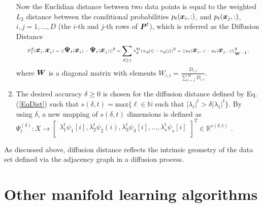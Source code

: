 \begin{enumerate}
{Now the Euclidian distance between two data points is equal to the weighted $L_2$ distance between the conditional probabilities ${{p}_t({\mbox{\boldmath $x$}}_i,:)}$, and ${{p}_t({\mbox{\boldmath $x$}}_j,:)}$, $i,j=1,...,D$ (the $i$-th and $j$-th rows of ${\mbox{\boldmath $P$}}^t$), which is referred as the Diffusion Distance
			\begin{equation}{ \label{EqDist} { {\cal{D}}^2_t( \myvec{x}_i,\myvec{x}_j)=||{\mymat{\Psi}_t{(\myvec{x}_i)}}-{\mymat{\Psi}_t{(\myvec{x}_j)}}||^2={  \sum_{d\geq{1}} {\lambda}^{2t}_d (\psi_d[i]-\psi_d[j])^2 }}=\\
			||{p_t}(\myvec{x}_i,:)-{p_t}(\myvec{x}_j,:)||^2_{\tiny\mymat{W}^{-1}}},
			\end{equation}
			where ${\mbox{\boldmath $W$}}$ is a diagonal matrix with elements
			$W_{i,i}=\frac{D_{i,i}}{\sum_{i=1}^M D_{i,i}}$.}
	\item{The desired accuracy $\delta \geq 0$ is chosen for the diffusion distance defined by Eq. (\ref{EqDist}) such that
		$s(\delta,t)=\text{max} \{\ell\in \mathbb{N}$  such that   $|\lambda_{\ell}|^t > \delta |\lambda_1|^t \}  $. By using $\delta$, a new mapping
		of $s(\delta,t)$ dimensions is defined as \\ \begin{math} {\Psi^{(\delta)}_t :  X \rightarrow \begin{bmatrix}
			{ \lambda_1^{t}\psi_1[i]} , { \lambda_2^{t}\psi_2(i)} , {
				\lambda_3^{t}\psi_3[i]} , {.} {.} {.}   ,
			
			{\lambda_{s}^{t}\psi_{s}[i]}\\
			
			\end{bmatrix}^T \in \mathbb{R}^{s(\delta,t)}} \end{math} .  }
\end{enumerate}

As discussed above, diffusion distance reflects the intrinsic geometry of the data set defined via the adjacency graph in a diffusion process.

\section{Other manifold learning algorithms}

